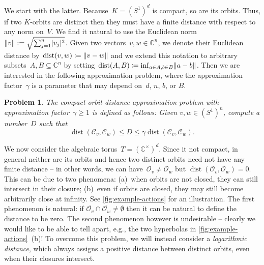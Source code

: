 \documentclass[a4paper,USenglish,cleveref,numberwithinsect]{lipics-v2021}
\newtheorem{problem}[theorem]{Problem}\crefname{problem}{Problem}{Problems}
\DeclareMathOperator{\dist}{dist}
\newcommand{\CC}{\mathbb{C}}
\newcommand{\OO}{\ensuremath{\mathcal{O}}}
\newcommand{\KK}{\ensuremath{\mathcal{C}}}
\DeclarePairedDelimiter\abs{\lvert}{\rvert}
\DeclarePairedDelimiter\norm{\lVert}{\rVert}
\numberwithin{equation}{section}
\begin{document}
We start with the latter.
Because~$K = (S^1)^d$ is compact, so are its orbits.
Thus, if two $K$-orbits are distinct then they must have a finite distance with respect to any norm on~$V$.
We find it natural to use the Euclidean norm~$\norm{v} := \sqrt{\sum_{j=1}^n \abs{v_j}^2}$.
Given two vectors~$v,w\in\CC^n$, we denote their Euclidean distance by~$\dist(v,w) \coloneqq \norm{v-w}$
and we extend this notation to arbitrary subsets~$A,B\subseteq\CC^n$
by setting~$\dist(A,B) \coloneqq \inf_{a\in A, b\in B} \norm{a-b}$.
Then we are interested in the following approximation problem,
where the approximation factor~$\gamma$ is a parameter that may depend on~$d$, $n$, $b$, or $B$.

\begin{problem}%
\label{prob:k-approx-dist}
The \emph{compact orbit distance approximation problem} with approximation factor~$\gamma\geq1$ is defined as follows:
Given $v,w\in (S^1)^n$, compute a number~$D$ such that
\[
 \dist(\KK_v,\KK_w) \le D \le \gamma \dist(\KK_v,\KK_w).
\]
\end{problem}

We now consider the algebraic torus~$T = (\CC^\times)^d$.
Since it not compact, in general neither are its orbits and hence two distinct orbits
need not have any finite distance -- in other words,
we can have~$\OO_v \neq \OO_w$ but $\dist(\OO_v, \OO_w) = 0$.
This can be due to two phenomena:
(a)~when orbits are not closed, they can still intersect in their closure;
(b)~even if orbits are closed, they may still become arbitrarily close at infinity.
See \cref{fig:example-actions} for an illustration.
The first phenomenon is natural:
if $\overline{\OO_v} \cap \overline{\OO_w} \neq \emptyset$
then it can be natural to define the distance to be zero.
The second phenomenon however is undesirable -- clearly we would like to be able to tell apart,
e.g., the two hyperbolas in \cref{fig:example-actions}~(b)! To overcome this problem, we will instead consider a \emph{logarithmic distance}, which always assigns a positive distance between distinct orbits, even when their closures intersect.
\end{document}
